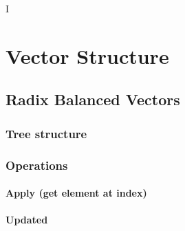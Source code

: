 I%

\chapter{Vector Structure} %

\label{VectorStructure} %



\section{Radix Balanced Vectors}


\subsection{Tree structure}


\subsection{Operations}


\subsubsection{Apply (get element at index)}



\subsubsection{Updated}

